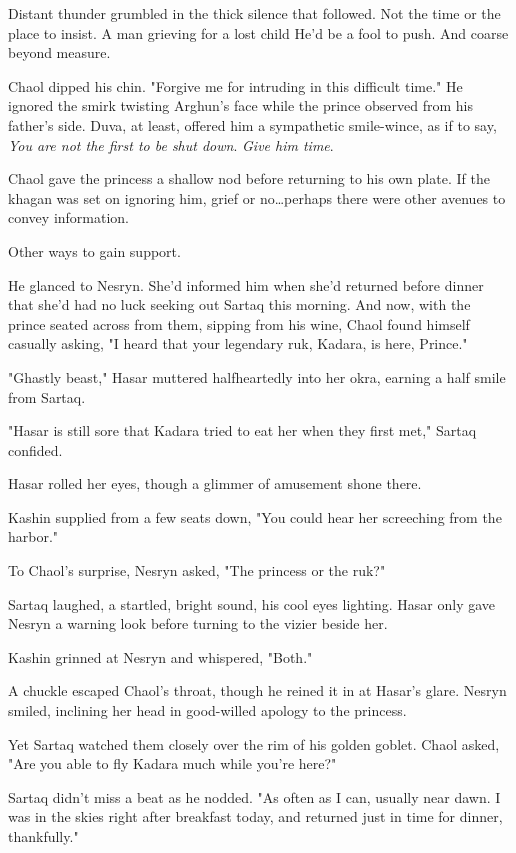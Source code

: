 Distant thunder grumbled in the thick silence that followed.
Not the time or the place to insist.
A man grieving for a lost child 
He'd be a fool to push.
And coarse beyond measure.

Chaol dipped his chin.
"Forgive me for intruding in this difficult time."
He ignored the smirk twisting Arghun's face while the prince observed from his father's side.
Duva, at least, offered him a sympathetic smile-wince, as if to say, \emph{You are not the first to be shut down}.
\emph{Give him time}.

Chaol gave the princess a shallow nod before returning to his own plate.
If the khagan was set on ignoring him, grief or no\ldots perhaps there were other avenues to convey information.

Other ways to gain support.

He glanced to Nesryn.
She'd informed him when she'd returned before dinner that she'd had no luck seeking out Sartaq this morning.
And now, with the prince seated across from them, sipping from his wine, Chaol found himself casually asking, "I heard that your legendary ruk, Kadara, is here, Prince."

"Ghastly beast," Hasar muttered halfheartedly into her okra, earning a half smile from Sartaq.

"Hasar is still sore that Kadara tried to eat her when they first met," Sartaq confided.

Hasar rolled her eyes, though a glimmer of amusement shone there.

Kashin supplied from a few seats down, "You could hear her screeching from the harbor."

To Chaol's surprise, Nesryn asked, "The princess or the ruk?"

Sartaq laughed, a startled, bright sound, his cool eyes lighting.
Hasar only gave Nesryn a warning look before turning to the vizier beside her.

Kashin grinned at Nesryn and whispered, "Both."

A chuckle escaped Chaol's throat, though he reined it in at Hasar's glare.
Nesryn smiled, inclining her head in good-willed apology to the princess.

Yet Sartaq watched them closely over the rim of his golden goblet.
Chaol asked, "Are you able to fly Kadara much while you're here?"

Sartaq didn't miss a beat as he nodded.
"As often as I can, usually near dawn.
I was in the skies right after breakfast today, and returned just in time for dinner, thankfully."

